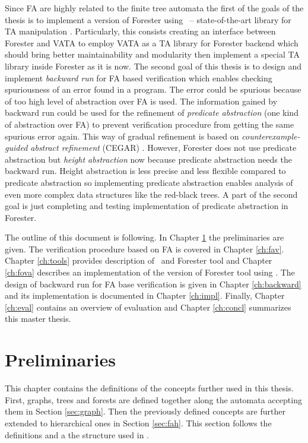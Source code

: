 Since FA are highly related to the finite tree automata the first of the goals of the thesis is to implement
a version of Forester using \vata\ -- state-of-the-art library for TA manipulation \cite{libvata}.
Particularly, this consists creating an interface between Forester and VATA to employ VATA as a TA library for Forester backend
which should bring better maintainability and modularity then implement a special TA library inside Forester as it is now.
The second goal of this thesis is to design and implement \emph{backward run} for FA based verification
which enables checking spuriousness of an error found in a program.
The error could be spurious because of too high level of abstraction over FA is used.
The information gained by backward run could be used for the refinement of \emph{predicate abstraction} (one kind of abstraction over FA)
to prevent verification procedure from getting the same spurious error again.
This way of gradual refinement is based on \emph{counterexample-guided abstract refinement} (CEGAR) \cite{cegar}.
However, Forester does not use predicate abstraction but \emph{height abstraction} now
because predicate abstraction needs the backward run.
Height abstraction is less precise and less flexible compared to predicate abstraction so implementing predicate abstraction
enables analysis of even more complex data structures like the red-black trees.
A part of the second goal is just completing and testing implementation of predicate abstraction in Forester.

The outline of this document is following.
In Chapter \ref{ch:prel} the preliminaries are given.
The verification procedure based on FA is covered in Chapter \ref{ch:fav}.
Chapter \ref{ch:tools} provides description of \vata\ and Forester tool and Chapter \ref{ch:fova} describes an implementation of the version of Forester tool using \vata.
The design of backward run for FA base verification is given in Chapter \ref{ch:backward} and its implementation is documented
in Chapter \ref{ch:impl}.
Finally,
Chapter \ref{ch:eval} contains an overview of evaluation and 
Chapter \ref{ch:concl} summarizes this master thesis.

\chapter{Preliminaries}
\label{ch:prel}

This chapter contains the definitions of the concepts further used in this thesis.
First, graphs, trees and forests are defined together along the automata accepting them in Section \ref{sec:graph}.
Then the previously defined concepts are further extended to hierarchical ones in Section \ref{sec:fah}.
This section follows the definitions and a the structure used in \cite{techrep}.


